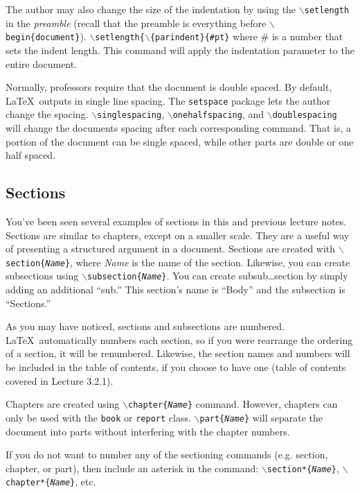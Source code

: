 \documentclass{article}
\begin{document}
The author may also change the size of the indentation by using the \texttt{$\backslash$setlength} in the \textit{preamble} (recall that the preamble is everything before \texttt{$\backslash$begin\{document\}}). \texttt{$\backslash$setlength\{$\backslash$\{parindent\}\{\textit{\#}pt\}} where \# is a number that sets the indent length. This command will apply the indentation parameter to the entire document.

Normally, professors require that the document is double spaced. By default, \LaTeX\ outputs in single line spacing. The \texttt{setspace} package lets the author change the spacing. \texttt{$\backslash$singlespacing}, \texttt{$\backslash$onehalfspacing}, and \texttt{$\backslash$doublespacing} will change the documents spacing after each corresponding command. That is, a portion of the document can be single spaced, while other parts are double or one half spaced.

\subsection{Sections}

You've been seen several examples of sections in this and previous lecture notes. Sections are similar to chapters, except on a smaller scale. They are a useful way of presenting a structured argument in a document. Sections are created with \texttt{$\backslash$section\{\textit{Name}\}}, where \textit{Name} is the name of the section. Likewise, you can create subsections using \texttt{$\backslash$subsection\{\textit{Name}\}}. You can create subsub\ldots section by simply adding an additional ``sub.'' This section's name is ``Body'' and the subsection is ``Sections.''

As you may have noticed, sections and subsections are numbered. \LaTeX\ automatically numbers each section, so if you were rearrange the ordering of a section, it will be renumbered. Likewise, the section names and numbers will be included in the table of contents, if you choose to have one (table of contents covered in Lecture 3.2.1).

Chapters are created using \texttt{$\backslash$chapter\{\textit{Name}\}} command. However, chapters can only be used with the \texttt{book} or \texttt{report} class. \texttt{$\backslash$part\{\textit{Name}\}} will separate the document into parts without interfering with the chapter numbers.

If you do not want to number any of the sectioning commands (e.g. section, chapter, or part), then include an asterisk in the command: \texttt{$\backslash$section*\{\textit{Name}\}}, \texttt{$\backslash$chapter*\{\textit{Name}\}}, etc.
\end{document}

